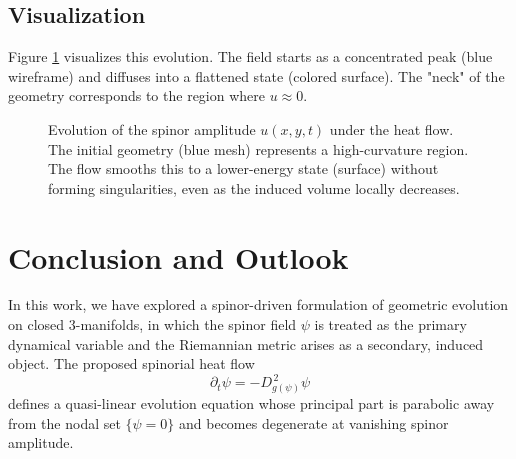 \documentclass[11pt, reqno, a4paper]{amsart}
\theoremstyle{definition}
\theoremstyle{remark}
\begin{document}
\subsection{Visualization}
Figure \ref{fig:2d_evolution} visualizes this evolution. The field starts as a concentrated peak (blue wireframe) and diffuses into a flattened state (colored surface). The "neck" of the geometry corresponds to the region where $u \approx 0$.

\begin{figure}[htbp]
\centering
{}
\caption{Evolution of the spinor amplitude $u(x,y,t)$ under the heat flow. The initial geometry (blue mesh) represents a high-curvature region. The flow smooths this to a lower-energy state (surface) without forming singularities, even as the induced volume locally decreases.}
\label{fig:2d_evolution}
\end{figure}

\section{Conclusion and Outlook}

In this work, we have explored a spinor-driven formulation of geometric evolution
on closed $3$-manifolds, in which the spinor field $\psi$ is treated as the primary
dynamical variable and the Riemannian metric arises as a secondary, induced object.
The proposed spinorial heat flow
\[
\partial_t \psi = - D_{g(\psi)}^{\,2} \psi
\]
defines a quasi-linear evolution equation whose principal part is parabolic away
from the nodal set $\{\psi = 0\}$ and becomes degenerate at vanishing spinor amplitude.
\end{document}
